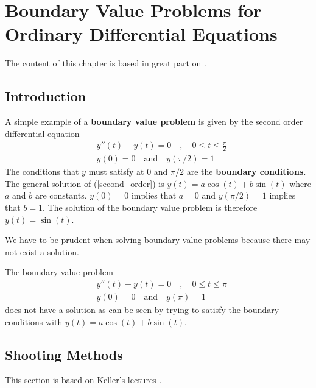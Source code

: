 \chapter[Boundary Value Problems] {Boundary Value Problems for
  Ordinary Differential Equations}
\label{chapBoundValProbl}

The content of this chapter is based in great part on \cite{K}.

\section{Introduction}

\begin{egg}
A simple example of a
{\bfseries boundary value problem} is given by
the second order differential equation
\begin{align}
&y''(t) + y(t) = 0 \quad , \quad  0 \leq t \leq \frac{\pi}{2}
\label{second_order} \\
&y(0) = 0 \quad \text{and} \quad y(\pi/2) = 1 \nonumber
\end{align}
The conditions that $y$ must satisfy at $0$ and $\pi/2$ are the
{\bfseries boundary conditions}.  The
general solution of (\ref{second_order}) is
$y(t) = a\cos(t) + b\sin(t)$ where $a$ and $b$ are constants.
$y(0)=0$ implies that $a=0$ and $y(\pi/2) = 1$ implies that
$b=1$.  The solution of the boundary value problem is therefore
$y(t) = \sin(t)$.
\label{egg_BVP}
\end{egg}

We have to be prudent when solving boundary value problems
because there may not exist a solution.

\begin{egg}
The boundary value problem
\begin{align*}
& y''(t) + y(t) = 0 \quad , \quad  0 \leq t \leq \pi \\
& y(0) = 0 \quad \text{and} \quad y(\pi) = 1 \nonumber
\end{align*}
does not have a solution as can be seen by trying to satisfy the
boundary conditions with $y(t) = a\cos(t) + b\sin(t)$.
\end{egg}

\section{Shooting Methods}

This section is based on Keller's lectures \cite{K}.

